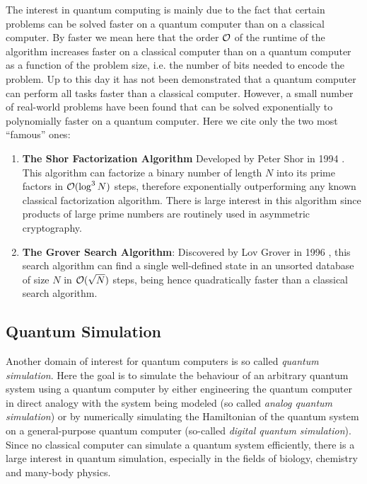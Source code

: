 The interest in quantum computing is mainly due to the fact that certain problems can be solved faster on a quantum computer than on a classical computer. By faster we mean here that the order $\cal{O}$ of the runtime of the algorithm increases faster on a classical computer than on a quantum computer as a function of the problem size, i.e. the number of bits needed to encode the problem. Up to this day it has not been demonstrated that a quantum computer can perform all tasks faster than a classical computer. However, a small number of real-world problems have been found that can be solved exponentially to polynomially faster on a quantum computer. Here we cite only the two most ``famous'' ones:

\begin{enumerate}
\item \textbf{The Shor Factorization Algorithm} Developed by Peter Shor in 1994 \citep{shor_algorithms_1994,shor_polynomial-time_1995}. This algorithm can factorize a binary number of length $N$ into its prime factors in $\begin{mathcal}O\end{mathcal}(\log^3{N})$ steps, therefore exponentially outperforming any known classical factorization algorithm. There is large interest in this algorithm since products of large prime numbers are routinely used in asymmetric cryptography.
\item \textbf{The Grover Search Algorithm}: Discovered by Lov Grover in 1996 \citep{grover_fast_1996}, this search algorithm can find a single well-defined state in an unsorted database of size $N$ in $\begin{mathcal}O\end{mathcal}(\sqrt{N})$ steps, being hence quadratically faster than a classical search algorithm.
\end{enumerate}

\subsection{Quantum Simulation}

Another domain of interest for quantum computers is so called {\it quantum simulation}. Here the goal is to simulate the behaviour of an arbitrary quantum system using a quantum computer by either engineering the quantum computer in direct analogy with the system being modeled (so called {\it analog quantum simulation}) or by numerically simulating the Hamiltonian of the quantum system on a general-purpose quantum computer (so-called {\it digital quantum simulation}). Since no classical computer can simulate a quantum system efficiently, there is a large interest in quantum simulation, especially in the fields of biology, chemistry and many-body physics.

